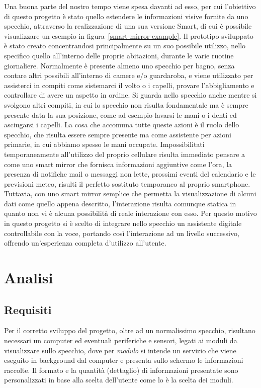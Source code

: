 \documentclass[12pt,a4paper]{article}
\begin{document}
Una buona parte del nostro tempo viene spesa davanti ad esso, per cui l'obiettivo
di questo progetto \`e stato quello estendere le informazioni visive fornite da uno
specchio, attraverso la realizzazione di una sua versione Smart, di cui \`e possibile
visualizzare un esempio in figura~\ref{smart-mirror-example}. Il prototipo sviluppato
\`e stato creato concentrandosi principalmente su un suo possibile utilizzo, nello
specifico quello all'interno delle proprie abitazioni, durante le varie ruotine
giornaliere. Normalmente \`e presente almeno uno specchio per bagno, senza contare
altri possibili all'interno di camere e/o guardaroba, e viene utilizzato per assisterci in compiti
come sistemarci il volto o i capelli, provare l'abbigliamento e controllare di avere un
aspetto in ordine. Si guarda nello specchio anche mentre si svolgono altri compiti, in cui
lo specchio non risulta fondamentale ma \`e sempre presente data la sua posizione, come
ad esempio lavarsi le mani o i denti ed asciugarsi i capelli. La cosa che accomuna tutte
queste azioni \`e il ruolo dello specchio, che risulta essere sempre presente ma come 
assistente per azioni primarie, in cui abbiamo spesso le mani occupate. Impossibilitati temporaneamente
all'utilizzo del proprio cellulare risulta immediato pensare a come uno smart mirror che
fornisca informazioni aggiuntive come l'ora, la presenza di notifiche mail o messaggi non lette,
prossimi eventi del calendario e le previsioni meteo, risulti il perfetto sostituto temporaneo al
proprio smartphone. Tuttavia, con uno smart mirror semplice che permetta la visualizzazione di alcuni dati
come quello appena descritto, l'interazione risulta comunque statica in quanto non vi \`e alcuna
possibilit\`a di reale interazione con esso. Per questo motivo in questo progetto si \`e scelto
di integrare nello specchio un assistente digitale controllabile con la voce, portando cos\`i l'interazione
ad un livello successivo, offrendo un'esperienza completa d'utilizzo all'utente.

\newpage
\section{Analisi}

\subsection{Requisiti}\label{requisiti}

Per il corretto sviluppo del progetto, oltre ad un normalissimo specchio, risultano necessari un computer
ed eventuali periferiche e sensori, legati ai moduli da visualizzare sullo specchio, dove per \textit{modulo}
si intende un servizio che viene eseguito in background dal computer e presenta sullo schermo le informazioni
raccolte. Il formato e la quantit\`a (dettaglio) di informazioni presentate sono personalizzati in base alla
scelta dell'utente come lo \`e la scelta dei moduli.
\end{document}
